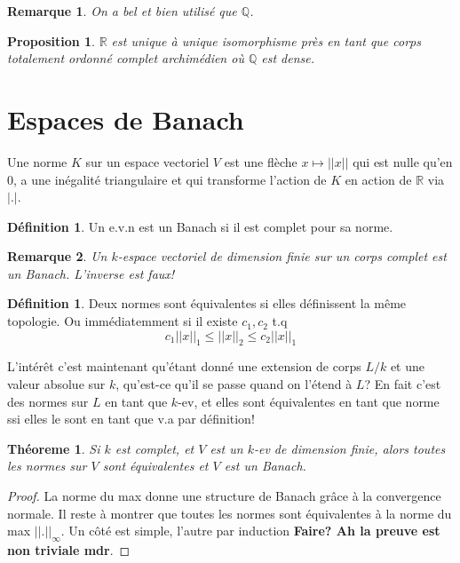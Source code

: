 \documentclass[a4paper,12pt]{book}
\newcommand{\R}{\mathbb{R}}
\newcommand{\Q}{\mathbb{Q}}
\theoremstyle{plain}
\newtheorem{thm}[subsection]{Théoreme}
\newtheorem{prop}[subsection]{Proposition}
\newtheorem{rem}{Remarque}
\theoremstyle{definition}
\newtheorem{defn}[subsection]{Définition}
\theoremstyle{remark}
\begin{document}
\begin{rem}
    On a bel et bien utilisé que $\Q$.
\end{rem}
\begin{prop}
    $\R$ est unique à unique isomorphisme près en tant que
    corps totalement ordonné complet archimédien où $\Q$ est dense.
\end{prop}

\section{Espaces de Banach}
Une norme $K$ sur un espace vectoriel $V$ est une flèche $x\mapsto ||x||$
qui est nulle qu'en $0$, a une inégalité triangulaire et qui transforme
l'action de $K$ en action de $\R$ via $|.|$.

\begin{defn}
    Un e.v.n est un Banach si il est complet pour sa norme.
\end{defn}
\begin{rem}
    Un $k$-espace vectoriel de dimension finie sur un corps complet
    est un Banach. L'inverse est faux!
\end{rem}
\begin{defn}
    Deux normes sont équivalentes si elles définissent la même topologie.
    Ou immédiatemment si il existe $c_1,c_2$ t.q 
    \[c_1||x||_1\leq ||x||_2\leq c_2||x||_1\]
\end{defn}
L'intérêt c'est maintenant qu'étant donné une extension de corps $L/k$
et une valeur absolue sur $k$, qu'est-ce qu'il se passe quand on l'étend
à $L$? En fait c'est des normes sur $L$ en tant que $k$-ev, et elles
sont équivalentes en tant que norme ssi elles le sont en tant que v.a 
par définition!
\begin{thm}
    Si $k$ est complet, et $V$ est un $k$-ev de dimension finie, alors
    toutes les normes sur $V$ sont équivalentes et $V$ est un Banach.
\end{thm}
\begin{proof}
    La norme du max donne une structure de Banach grâce à la convergence
    normale. Il reste à montrer que toutes les normes sont équivalentes
    à la norme du max $||.||_{\infty}$. Un côté est simple, l'autre 
    par induction \textbf{Faire? Ah la preuve est non triviale mdr}.
\end{proof}
\end{document}
